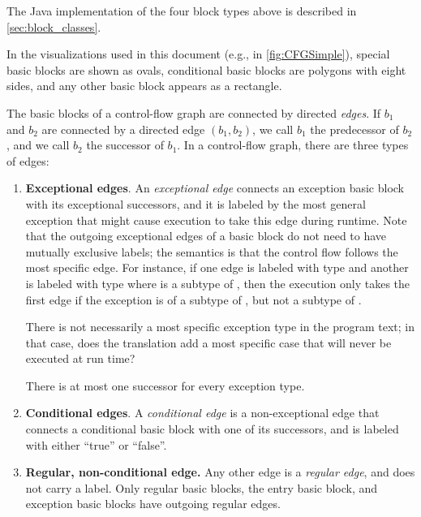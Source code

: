 The Java implementation of the four block types above is described in \autoref{sec:block_classes}.

In the visualizations used in this document (e.g., in \autoref{fig:CFGSimple}), special basic blocks are
shown as ovals, conditional basic blocks are polygons with eight sides, and any
other basic block appears as a rectangle.

\begin{definition}
\label{def:edges}
The basic blocks of a control-flow graph are connected by directed \emph{edges}.
If $b_1$ and $b_2$ are connected by a directed edge $(b_1,b_2)$, we call
$b_1$ the predecessor of $b_2$, and we call $b_2$ the successor of $b_1$.
In a control-flow graph, there are three types of edges:
\begin{enumerate}
    \item \textbf{Exceptional edges}. An \emph{exceptional edge} connects an exception basic block
    with its exceptional successors, and it is labeled by the most
    general exception that might cause execution to take this edge during runtime.
    Note that the outgoing exceptional edges of a basic block do not need to have mutually
    exclusive labels; the semantics is that the control flow follows the most specific
    edge. For instance, if one edge is labeled with type  and another is labeled
    with type  where  is a subtype of , then the execution only takes
    the first edge if the exception is of a subtype of , but not a subtype of .
    
\begin{workinprogress}
There is not necessarily a most specific exception type in the program
text; in that case, does the translation add a most specific case that will
never be executed at run time?
\end{workinprogress}

    There is at most one successor for every exception type.
    \item \textbf{Conditional edges}. A \emph{conditional edge} is a non-exceptional
    edge that connects a conditional
    basic block with one of its successors, and is labeled with either ``true'' or
    ``false''.
    \item \textbf{Regular, non-conditional edge.} Any other edge is a \emph{regular edge}, and does not carry
    a label. Only regular basic blocks, the entry basic block, and exception basic blocks have outgoing
    regular edges.
\end{enumerate}
\end{definition}


